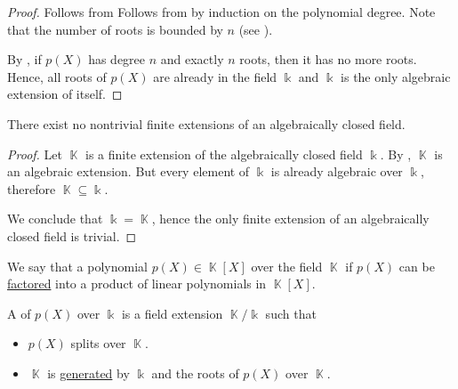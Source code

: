 \begin{proof}
   Follows from  Follows from  by induction on the polynomial degree. Note that the number of roots is bounded by \( n \) (see ).

   By , if \( p(X) \) has degree \( n \) and exactly \( n \) roots, then it has no more roots. Hence, all roots of \( p(X) \) are already in the field \( \Bbbk \) and \( \Bbbk \) is the only algebraic extension of itself.
\end{proof}

\begin{proposition}\label{thm:no_finite_extensions_of_closed_fields}
  There exist no nontrivial finite extensions of an algebraically closed field.
\end{proposition}
\begin{proof}
  Let \( \BbbK \) is a finite extension of the algebraically closed field \( \Bbbk \). By , \( \BbbK \) is an algebraic extension. But every element of \( \Bbbk \) is already algebraic over \( \Bbbk \), therefore \( \BbbK \subseteq \Bbbk \).

  We conclude that \( \Bbbk = \BbbK \), hence the only finite extension of an algebraically closed field is trivial.
\end{proof}

\begin{definition}\label{def:splitting_field}
  We say that a polynomial \( p(X) \in \BbbK[X] \) over the field \( \BbbK \)  if \( p(X) \) can be \hyperref[def:factorization_in_ring]{factored} into a product of linear polynomials in \( \BbbK[X] \).

  A  of \( p(X) \) over \( \Bbbk \) is a field extension \( \BbbK / \Bbbk \) such that
  \begin{itemize}
    \item \( p(X) \) splits over \( \BbbK \).
    \item \( \BbbK \) is \hyperref[def:generated_ring_ideal]{generated} by \( \Bbbk \) and the roots of \( p(X) \) over \( \BbbK \).
  \end{itemize}
\end{definition}

